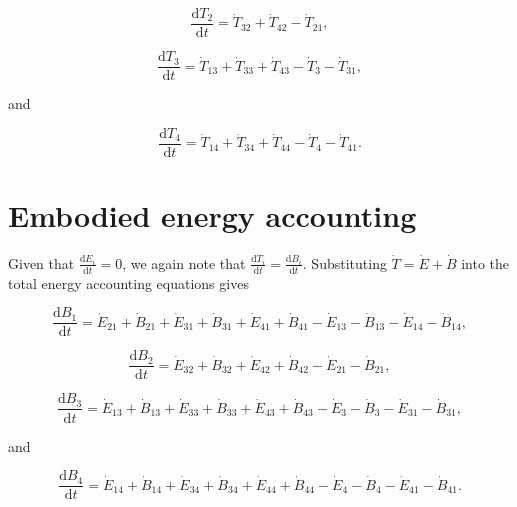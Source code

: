 \begin{equation} \label{eq:C-CV_T_2}
	\frac{\mathrm{d}T_{2}}{\mathrm{d}t} 	 = \dot{T}_{32} + \dot{T}_{42} - \dot{T}_{21},
\end{equation}

\begin{equation} \label{eq:C-CV_T_3}
	\frac{\mathrm{d}T_{3}}{\mathrm{d}t} 	 = \dot{T}_{13} + \dot{T}_{33} + \dot{T}_{43} - \dot{T}_{3} - \dot{T}_{31},
\end{equation}

\noindent and 

\begin{equation} \label{eq:C-CV_T_4}
	\frac{\mathrm{d}T_{4}}{\mathrm{d}t} 	 = \dot{T}_{14} + \dot{T}_{34} + \dot{T}_{44} - \dot{T}_{4} - \dot{T}_{41}.
\end{equation}

\section{Embodied energy accounting}

Given that $\frac{\mathrm{d}E_{i}}{\mathrm{d}t} = 0$, we again note that $\frac{\mathrm{d}T_i}{\mathrm{d}t} = \frac{\mathrm{d}B_i}{\mathrm{d}t}$. Substituting $\dot{T} = \dot{E} + \dot{B}$ into the total energy accounting equations gives

\begin{equation} \label{eq:C-CV_dB_1}
	\frac{\mathrm{d}B_{1}}{\mathrm{d}t} 	 = \dot{E}_{21} + \dot{B}_{21} + \dot{E}_{31} + \dot{B}_{31} + \dot{E}_{41} + \dot{B}_{41} - \dot{E}_{13} - \dot{B}_{13} - \dot{E}_{14} - \dot{B}_{14},
\end{equation}

\begin{equation} \label{eq:C-CV_dB_2}
	\frac{\mathrm{d}B_{2}}{\mathrm{d}t} 	 = \dot{E}_{32} + \dot{B}_{32} + \dot{E}_{42} + \dot{B}_{42} - \dot{E}_{21} - \dot{B}_{21},
\end{equation}

\begin{equation} \label{eq:C-CV_dB_3}
	\frac{\mathrm{d}B_{3}}{\mathrm{d}t} 	 = \dot{E}_{13} + \dot{B}_{13} + \dot{E}_{33} + \dot{B}_{33} + \dot{E}_{43} + \dot{B}_{43} - \dot{E}_{3} - \dot{B}_{3} - \dot{E}_{31} - \dot{B}_{31},
\end{equation}

\noindent and 

\begin{equation} \label{eq:C-CV_dB_4}
	\frac{\mathrm{d}B_{4}}{\mathrm{d}t} 	 = \dot{E}_{14} + \dot{B}_{14} + \dot{E}_{34} + \dot{B}_{34} + \dot{E}_{44} + \dot{B}_{44} - \dot{E}_{4} - \dot{B}_{4} - \dot{E}_{41} - \dot{B}_{41}.
\end{equation}

